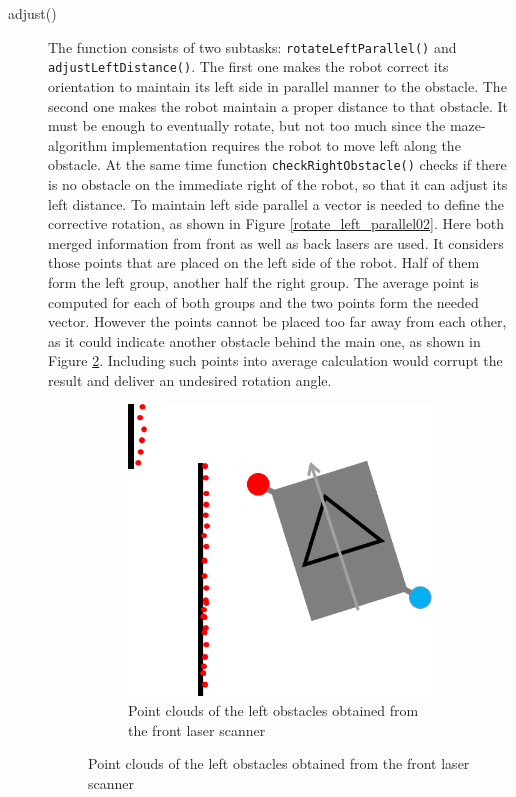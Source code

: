 \begin{description}
\item[adjust()] The function consists of two subtasks: \texttt{rotateLeftParallel()} and \\ \texttt{adjustLeftDistance()}. The first one makes the robot correct its orientation to maintain its left side in parallel manner to the obstacle. The second one makes the robot maintain a proper distance to that obstacle. It must be enough to eventually rotate, but not too much since the maze-algorithm implementation requires the robot to move left along the obstacle. At the same time function \texttt{checkRightObstacle()} checks if there is no obstacle on the immediate right of the robot, so that it can adjust its left distance. To maintain left side parallel a vector is needed to define the corrective rotation, as shown in Figure \ref{rotate_left_parallel02}. Here both merged information from front as well as back lasers are used. It considers those points that are placed on the left side of the robot. Half of them form the left group, another half the right group. The average point is computed for each of both groups and the two points form the needed vector. However the points cannot be placed too far away from each other, as it could indicate another obstacle behind the main one, as shown in Figure \ref{rotate_left_parallel01}. Including such points into average calculation would corrupt the result and deliver an undesired rotation angle.

\begin{figure}[htb]
\centering
\begin{subfigure}{.65\textwidth}
	\centering
	\includegraphics[width=0.8\linewidth]{graphics/rotate_left_parallel01.png}
	\caption{Point clouds of the left obstacles obtained from the front laser scanner}
	\label{rotate_left_parallel01}
	\centering
\end{subfigure}


\end{figure}
\end{description}
